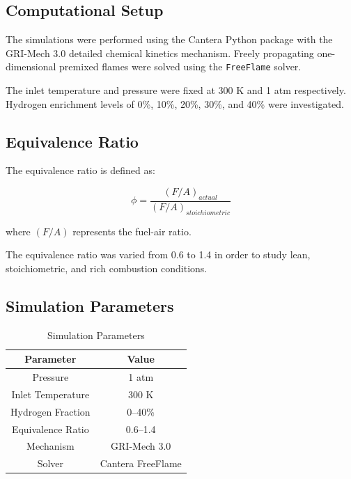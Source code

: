 \documentclass[conference]{IEEEtran}
\begin{document}
\subsection{Computational Setup}

The simulations were performed using the Cantera Python package with the GRI-Mech 3.0 detailed chemical kinetics mechanism. Freely propagating one-dimensional premixed flames were solved using the \texttt{FreeFlame} solver.

The inlet temperature and pressure were fixed at 300 K and 1 atm respectively. Hydrogen enrichment levels of 0\%, 10\%, 20\%, 30\%, and 40\% were investigated.

\subsection{Equivalence Ratio}

The equivalence ratio is defined as:

\begin{equation}
\phi = \frac{(F/A)_{actual}}{(F/A)_{stoichiometric}}
\end{equation}

where $(F/A)$ represents the fuel-air ratio.

The equivalence ratio was varied from 0.6 to 1.4 in order to study lean, stoichiometric, and rich combustion conditions.

\subsection{Simulation Parameters}

\begin{table}[H]
\centering
\caption{Simulation Parameters}
\begin{tabular}{cc}
\toprule
Parameter & Value \\
\midrule
Pressure & 1 atm \\
Inlet Temperature & 300 K \\
Hydrogen Fraction & 0--40\% \\
Equivalence Ratio & 0.6--1.4 \\
Mechanism & GRI-Mech 3.0 \\
Solver & Cantera FreeFlame \\
\bottomrule
\end{tabular}
\end{table}

\end{document}
